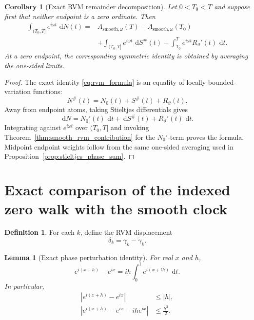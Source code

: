 \documentclass[11pt]{amsart}
\numberwithin{equation}{section}
\theoremstyle{plain}
\newtheorem{lemma}[theorem]{Lemma}
\newtheorem{corollary}[theorem]{Corollary}
\theoremstyle{definition}
\newtheorem{definition}[theorem]{Definition}
\theoremstyle{remark}
\newcommand{\1}{\mathbf{1}}
\newcommand{\dd}{\,\mathrm{d}}
\begin{document}
\begin{corollary}[Exact RVM remainder decomposition]
\label{cor:rvm_remainder_decomposition}
Let \(0<T_0<T\) and suppose first that neither endpoint is a zero
ordinate.  Then
\begin{align}
\int_{(T_0,T]}e^{i\omega t}\,\dd N(t)
={}&
A_{\mathrm{smooth},\omega}(T)
-
A_{\mathrm{smooth},\omega}(T_0)
\label{eq:rvm_remainder_decomposition_one}
\\
&+
\int_{(T_0,T]}e^{i\omega t}\,\dd S^{\#}(t)
+
\int_{T_0}^{T}e^{i\omega t}R_\vartheta'(t)\,\dd t.
\label{eq:rvm_remainder_decomposition_two}
\end{align}
At a zero endpoint, the corresponding symmetric identity is obtained by
averaging the one-sided limits.
\end{corollary}

\begin{proof}
The exact identity \eqref{eq:rvm_formula} is an equality of locally
bounded-variation functions:
\begin{equation}
N^{\#}(t)=N_0(t)+S^{\#}(t)+R_\vartheta(t).
\label{eq:rvm_linear_decomposition_proof}
\end{equation}
Away from endpoint atoms, taking Stieltjes differentials gives
\begin{equation}
\dd N
=
N_0'(t)\,\dd t+\dd S^{\#}(t)+R_\vartheta'(t)\,\dd t.
\label{eq:rvm_differential_decomposition}
\end{equation}
Integrating against \(e^{i\omega t}\) over \((T_0,T]\) and invoking
Theorem~\ref{thm:smooth_rvm_contribution} for the \(N_0'\)-term proves
the formula.  Midpoint endpoint weights follow from the same one-sided
averaging used in Proposition~\ref{prop:stieltjes_phase_sum}.
\end{proof}

\section{Exact comparison of the indexed zero walk with the smooth clock}
\label{sec:indexed_rvm_comparison}

\begin{definition}
\label{def:index_displacement}
For each \(k\), define the RVM displacement
\begin{equation}
\delta_k
=
\gamma_k-\widetilde\gamma_k.
\label{eq:index_displacement}
\end{equation}
\end{definition}

\begin{lemma}[Exact phase perturbation identity]
\label{lem:phase_perturbation}
For real \(x\) and \(h\),
\begin{equation}
e^{i(x+h)}-e^{ix}
=
ih\int_0^1e^{i(x+th)}\,\dd t.
\label{eq:phase_perturbation_integral}
\end{equation}
In particular,
\begin{align}
|e^{i(x+h)}-e^{ix}|
&\leq |h|,
\label{eq:phase_lipschitz}
\\
\left|e^{i(x+h)}-e^{ix}-ihe^{ix}\right|
&\leq\frac{h^2}{2}.
\label{eq:phase_quadratic_remainder}
\end{align}
\end{lemma}
\end{document}
